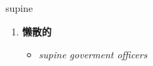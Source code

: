 
\begin{frame}
{\huge supine}
\begin{center}
\begin{enumerate}\Large
  \item \textbf{懒散的}
  \begin{itemize}
    \item \em{\Large{supine goverment officers}}
  \end{itemize}
\end{enumerate}
\end{center}
\end{frame}
